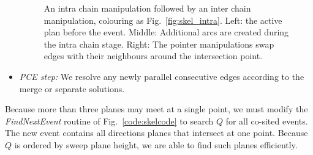 \begin{itemize}
\begin{figure}
  \centering
  \def\svgwidth{0.8\columnwidth}
  
  \caption[Inter chain pointer manipulation]{\label{fig:skel_inter}An intra chain manipulation followed by an inter chain manipulation, colouring as Fig.~\ref{fig:skel_intra}. Left: the active plan before the event. Middle:  Additional arcs are created during the intra chain stage. Right: The pointer manipulations swap edges with their neighbours around the intersection point.}
\end{figure}
\item{\emph{PCE step:} We resolve any newly parallel consecutive edges according to the merge or separate solutions.}
\end{itemize}

Because more than three planes may meet at a single point, we must modify the \emph{FindNextEvent} routine of Fig.~\ref{code:skelcode} to search $Q$ for all co-sited events. The new event contains all directions planes that intersect at one point. Because $Q$ is ordered by sweep plane height, we are able to find such planes efficiently.



